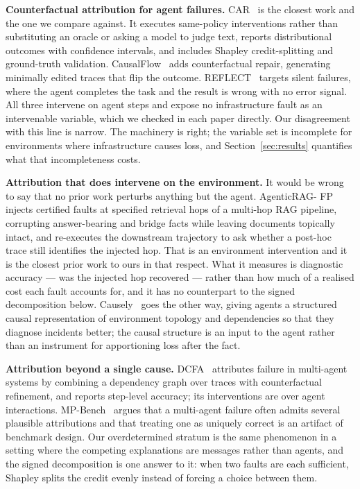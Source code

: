 \documentclass[conference]{IEEEtran}
\begin{document}
\textbf{Counterfactual attribution for agent failures.} CAR~\cite{car} is the
closest work and the one we compare against. It executes same-policy
interventions rather than substituting an oracle or asking a model to judge
text, reports distributional outcomes with confidence intervals, and includes
Shapley credit-splitting and ground-truth validation. CausalFlow~\cite{causalflow}
adds counterfactual repair, generating minimally edited traces that flip the
outcome. REFLECT~\cite{reflect} targets silent failures, where the agent
completes the task and the result is wrong with no error signal. All three intervene on agent steps and expose no infrastructure fault as an
intervenable variable, which we checked in each paper directly. Our
disagreement with this line is narrow. The machinery is right; the variable
set is incomplete for environments where infrastructure causes loss, and
Section~\ref{sec:results} quantifies what that incompleteness costs.

\textbf{Attribution that does intervene on the environment.} It would be wrong
to say that no prior work perturbs anything but the agent. AgenticRAG-
FP~\cite{agenticragfp} injects certified faults at specified retrieval hops of
a multi-hop RAG pipeline, corrupting answer-bearing and bridge facts while
leaving documents topically intact, and re-executes the downstream trajectory
to ask whether a post-hoc trace still identifies the injected hop. That is an
environment intervention and it is the closest prior work to ours in that
respect. What it measures is diagnostic accuracy --- was the injected hop
recovered --- rather than how much of a realised cost each fault accounts for,
and it has no counterpart to the signed decomposition below.
Causely~\cite{causely} goes the other way, giving agents a structured causal
representation of environment topology and dependencies so that they diagnose
incidents better; the causal structure is an input to the agent rather than an
instrument for apportioning loss after the fact.

\textbf{Attribution beyond a single cause.} DCFA~\cite{dcfa} attributes
failure in multi-agent systems by combining a dependency graph over traces
with counterfactual refinement, and reports step-level accuracy; its
interventions are over agent interactions. MP-Bench~\cite{mpbench} argues that
a multi-agent failure often admits several plausible attributions and that
treating one as uniquely correct is an artifact of benchmark design. Our
overdetermined stratum is the same phenomenon in a setting where the competing
explanations are messages rather than agents, and the signed decomposition is
one answer to it: when two faults are each sufficient, Shapley splits the
credit evenly instead of forcing a choice between them.
\end{document}
